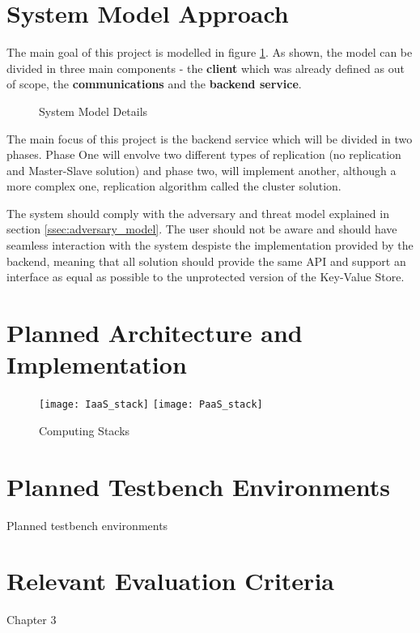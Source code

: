 \section{System Model Approach} %
\label{sec:system_model_approach}

The main goal of this project is modelled in figure \ref{fig:syste_model_detailed}. As shown, the model can be divided in three main components - the \textbf{client} which was already defined as out of scope, the \textbf{communications} and the \textbf{backend service}. 

\begin{figure}[htbp]
  \caption{System Model Details}
  \label{fig:syste_model_detailed}
\end{figure}

The main focus of this project is the backend service which will be divided in two phases. Phase One will envolve two different types of replication (no replication and Master-Slave solution) and phase two, will implement another, although a more complex one, replication algorithm called the cluster solution.

The system should comply with the adversary and threat model explained in section \ref{ssec:adversary_model}. The user should not be aware and should have seamless interaction with the system despiste the implementation provided by the backend, meaning that all solution should provide the same \gls{API} and support an interface as equal as possible to the unprotected version of the Key-Value Store.

\section{Planned Architecture and Implementation} %
\label{sec:planned_architecture_and_implementation}

\begin{figure}[htbp]
  \centering
    {\texttt{[image: IaaS\_stack]}}%
    \hspace{5em}
    {\texttt{[image: PaaS\_stack]}}%
  \caption{Computing Stacks}
  \label{fig:fig2subfig}
\end{figure}

\section{Planned Testbench Environments} %
\label{sec:planned_testbench_environments}

Planned testbench environments

\section{Relevant Evaluation Criteria} %
\label{sec:relevant_evaluation_criteria}

Chapter 3
